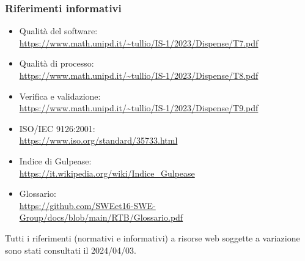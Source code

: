 \subsubsection{Riferimenti informativi}
\begin{itemize}
    \item Qualità del software: \\
    \url{https://www.math.unipd.it/~tullio/IS-1/2023/Dispense/T7.pdf}
    \item Qualità di processo:\\
    \url{https://www.math.unipd.it/~tullio/IS-1/2023/Dispense/T8.pdf}
    \item Verifica e validazione: \\
    \url{https://www.math.unipd.it/~tullio/IS-1/2023/Dispense/T9.pdf}
    \item ISO/IEC 9126:2001: \\
    \url{https://www.iso.org/standard/35733.html}
    \item Indice di Gulpease: \\
    \url{https://it.wikipedia.org/wiki/Indice_Gulpease}
    \item Glossario: \\
    \url{https://github.com/SWEet16-SWE-Group/docs/blob/main/RTB/Glossario.pdf} 
\end{itemize}

Tutti i riferimenti (normativi e informativi) a risorse web soggette a variazione sono stati consultati il 2024/04/03.

